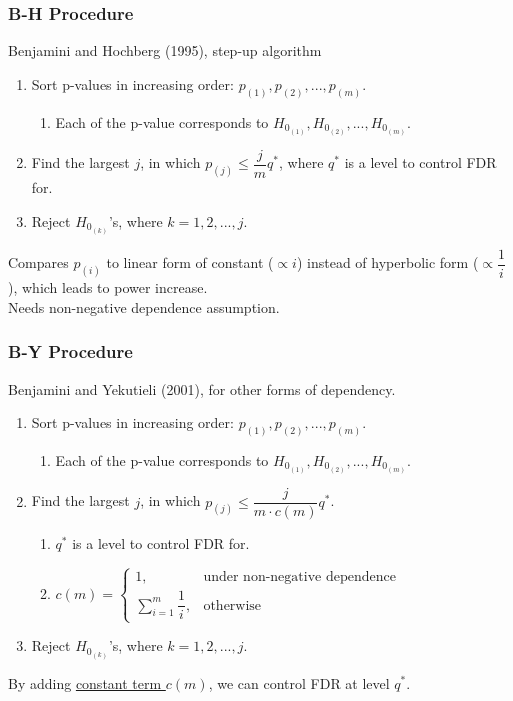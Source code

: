 \documentclass{beamer}
\begin{document}
\frame
{
    \frametitle{B-H Procedure}
    Benjamini and Hochberg (1995), step-up algorithm \vspace{0.2in}\\
    \begin{enumerate}
  \item Sort p-values in increasing order: $p_{(1)}, p_{(2)}, ..., p_{(m)}$.
    \begin{enumerate}[-]
    \item Each of the p-value corresponds to $H_{0_{(1)}}, H_{0_{(2)}}, ..., H_{0_{(m)}}$. 
    \end{enumerate}
  \item Find the largest $j$, in which $p_{(j)} \leq \dfrac{j}{m}q^*$, where $q^*$ is a level to control FDR for.
  \item Reject $H_{0_{(k)}}$'s, where $k=1, 2, ..., j$.\vspace{0.22in}\\
  \end{enumerate}  
  Compares $p_{(i)}$ to linear form of constant ($\propto i$) instead of hyperbolic form ($\propto \dfrac{1}{i}$), which leads to power increase.\vspace{0.07in}\\
  Needs non-negative dependence assumption.\\
}

\frame
{
    \frametitle{B-Y Procedure}
    Benjamini and Yekutieli (2001), for other forms of dependency. \vspace{0.2in}\\
    \begin{enumerate}
  \item Sort p-values in increasing order: $p_{(1)}, p_{(2)}, ..., p_{(m)}$.
    \begin{enumerate}[-]
    \item Each of the p-value corresponds to $H_{0_{(1)}}, H_{0_{(2)}}, ..., H_{0_{(m)}}$. 
    \end{enumerate}
  \item Find the largest $j$, in which $p_{(j)} \leq \dfrac{j}{m \cdot c(m)}q^*$. \\
    \begin{enumerate}[-]
      \item $q^*$ is a level to control FDR for.\\
      \item $
        c(m)=
        \begin{cases}
          1, & \text{under non-negative dependence} \\
          \sum_{i=1}^m \dfrac{1}{i}, & \text{otherwise}
        \end{cases}
      $\\
    \end{enumerate}
  \item Reject $H_{0_{(k)}}$'s, where $k=1, 2, ..., j$.\vspace{0.22in}\\
  \end{enumerate}  
  By adding \underline{constant term $c(m)$}, we can control FDR at level $q^*$. \vspace{0.1in}\\
}
\end{document}
